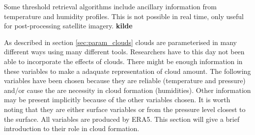Some threshold retrieval algorithms include ancillary information from temperature and humidity profiles. This is not possible in real time, only useful for post-processing satellite imagery. \textbf{kilde}

As described in section \ref{sec:param_clouds} clouds are parameterised in many different ways using many different tools. Researchers have to this day not been able to incorporate the effects of clouds. There might be enough information in these variables to make a adaquate representation of cloud amount. The following variables have been chosen because they are reliable (temperature and pressure) and/or cause the are necessity in cloud formation (humidities). Other information may be present implicitly because of the other variables chosen. It is worth noting that they are either surface variables or from the pressure level closest to the surface. All variables are produced by ERA5. This section will give a brief introduction to their role in cloud formation. 

